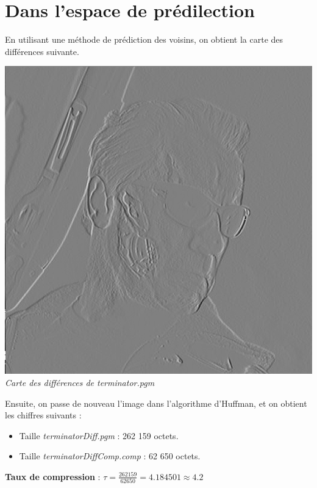\documentclass[a4paper,11pt]{article}
\begin{document}
\section{Dans l'espace de prédilection}

En utilisant une méthode de prédiction des voisins, on obtient la carte des différences suivante.

\begin{center}
\includegraphics[scale=0.5]{./terminatordiff.png}\\
\textit{Carte des différences de terminator.pgm}
\end{center}

Ensuite, on passe de nouveau l'image dans l'algorithme d'Huffman, et on obtient les chiffres suivants :

\vspace{0,5cm}

\begin{itemize}
\item Taille \textit{terminatorDiff.pgm} : 262 159 octets.
\item Taille \textit{terminatorDiffComp.comp} : 62 650 octets.
\end{itemize}

\vspace{0,2cm}

\textbf{Taux de compression} : $\tau = \frac{262 159}{62 650} = 4.184501 \approx 4.2$
\end{document}
